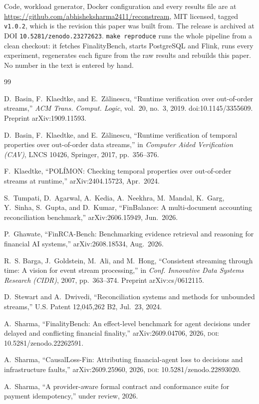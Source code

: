 \documentclass[10pt,conference]{IEEEtran}
\begin{document}
Code, workload generator, Docker configuration and every results file are at
\url{https://github.com/abhisheksharma2411/reconstream}, MIT licensed, tagged
\texttt{v1.0.2}, which is the revision this paper was built from. The release is archived at DOI \texttt{10.5281/zenodo.23272623}.
\texttt{make reproduce} runs the whole
pipeline from a clean checkout: it fetches FinalityBench, starts PostgreSQL and
Flink, runs every experiment, regenerates each figure from the raw results and
rebuilds this paper. No number in the text is entered by hand.

\begin{thebibliography}{99}

D.~Basin, F.~Klaedtke, and E.~Z\u{a}linescu, ``Runtime verification over
out-of-order streams,'' \emph{ACM Trans. Comput. Logic}, vol.~20, no.~3, 2019.
doi:10.1145/3355609. Preprint arXiv:1909.11593.

D.~Basin, F.~Klaedtke, and E.~Z\u{a}linescu, ``Runtime verification of temporal
properties over out-of-order data streams,'' in \emph{Computer Aided
Verification (CAV)}, LNCS 10426, Springer, 2017, pp.~356--376.

F.~Klaedtke, ``POL\'IMON: Checking temporal properties over out-of-order
streams at runtime,'' arXiv:2404.15723, Apr.~2024.

S.~Tumpati, D.~Agarwal, A.~Kedia, A.~Neekhra, M.~Mandal, K.~Garg, Y.~Sinha,
S.~Gupta, and D.~Kumar, ``FinBalance: A multi-document accounting
reconciliation benchmark,'' arXiv:2606.15949, Jun.~2026.

P.~Ghawate, ``FinRCA-Bench: Benchmarking evidence retrieval and reasoning for
financial AI systems,'' arXiv:2608.18534, Aug.~2026.

R.~S. Barga, J.~Goldstein, M.~Ali, and M.~Hong, ``Consistent streaming through
time: A vision for event stream processing,'' in \emph{Conf. Innovative Data
Systems Research (CIDR)}, 2007, pp.~363--374. Preprint arXiv:cs/0612115.

D.~Stewart and A.~Dwivedi, ``Reconciliation systems and methods for unbounded
streams,'' U.S. Patent 12,045,262 B2, Jul.~23, 2024.

A.~Sharma, ``FinalityBench: An effect-level benchmark for agent decisions under
delayed and conflicting financial finality,'' arXiv:2609.04706, 2026,
\textsc{doi}: 10.5281/zenodo.22262591.

A.~Sharma, ``CausalLoss-Fin: Attributing financial-agent loss to decisions and
infrastructure faults,'' arXiv:2609.25960, 2026,
\textsc{doi}: 10.5281/zenodo.22893020.

A.~Sharma, ``A provider-aware formal contract and conformance suite for payment
idempotency,'' under review, 2026.

\end{thebibliography}

\balance
\end{document}

